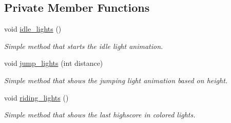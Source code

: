 \subsection*{Private Member Functions}
\begin{DoxyCompactItemize}
\item 
void \hyperlink{classlight__board_a349f0fb606365bdee608970a1f3754dd}{idle\+\_\+lights} ()\hypertarget{classlight__board_a349f0fb606365bdee608970a1f3754dd}{}\label{classlight__board_a349f0fb606365bdee608970a1f3754dd}

\begin{DoxyCompactList}\small\item\em Simple method that starts the idle light animation. \end{DoxyCompactList}\item 
void \hyperlink{classlight__board_a75eb746dcbbd989d3cfb50943880f62f}{jump\+\_\+lights} (int distance)\hypertarget{classlight__board_a75eb746dcbbd989d3cfb50943880f62f}{}\label{classlight__board_a75eb746dcbbd989d3cfb50943880f62f}

\begin{DoxyCompactList}\small\item\em Simple method that shows the jumping light animation based on height. \end{DoxyCompactList}\item 
void \hyperlink{classlight__board_a58809e870fe55a2aae1e85829c0f73eb}{riding\+\_\+lights} ()\hypertarget{classlight__board_a58809e870fe55a2aae1e85829c0f73eb}{}\label{classlight__board_a58809e870fe55a2aae1e85829c0f73eb}

\begin{DoxyCompactList}\small\item\em Simple method that shows the last highscore in colored lights. \end{DoxyCompactList}\end{DoxyCompactItemize}
